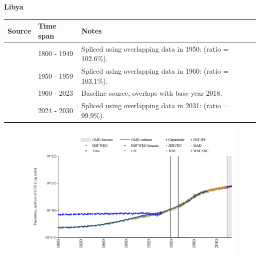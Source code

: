 \documentclass[12pt,a4paper,landscape]{article}
\begin{document}
\begin{adjustbox}{max totalsize={\paperwidth}{\paperheight},center}
\begin{minipage}[t][\textheight][t]{\textwidth}
\vspace*{0.5cm}
{}
\begin{center}
{\Large\bfseries Libya}
\end{center}
\vspace{0.5cm}
\begin{table}[H]
\centering
\small
\begin{tabular}{|l|l|l|}
\hline
\textbf{Source} & \textbf{Time span} & \textbf{Notes} \\
\hline
\rowcolor{white}\cite{Gapminder}& 1800 - 1949 &Spliced using overlapping data in 1950: (ratio = 102.6\%).\\
\rowcolor{lightgray}\cite{IMF_IFS}& 1950 - 1959 &Spliced using overlapping data in 1960: (ratio = 103.1\%).\\
\rowcolor{white}\cite{WDI}& 1960 - 2023 &Baseline source, overlaps with base year 2018.\\
\rowcolor{lightgray}\cite{Gapminder}& 2024 - 2030 &Spliced using overlapping data in 2031: (ratio = 99.9\%).\\
\hline
\end{tabular}
\end{table}
\begin{figure}[H]
\centering
\includegraphics[width=\textwidth,height=0.6\textheight,keepaspectratio]{graphs/LBY_pop.pdf}
\end{figure}
\end{minipage}
\end{adjustbox}
\end{document}
